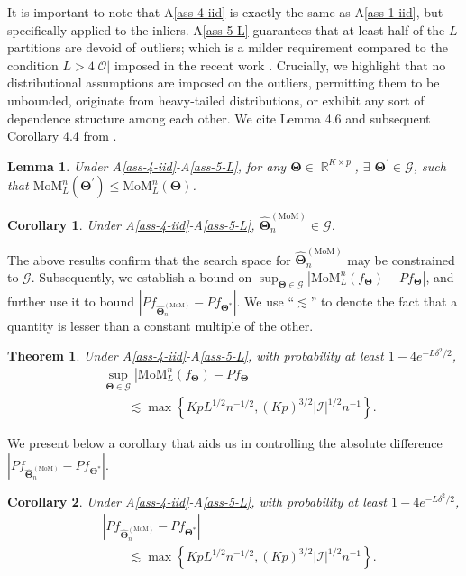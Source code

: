 \documentclass{article}
\def\Real{\mathop{\mathbb{R}}\nolimits}
\newcommand{\bTheta}{\boldsymbol{\Theta}}
\newcommand{\I}{\mathcal{I}}
\newcommand{\cO}{\mathcal{O}}
\newcommand{\tm}{\widehat{\bTheta}_n^{(\text{MoM})}}
\newtheorem{thm}{Theorem}[section]
\newtheorem{lemma}{Lemma}[section]
\newtheorem{cor}{Corollary}[section]
\begin{document}
It is important to note that A\ref{ass-4-iid} is exactly the same as A\ref{ass-1-iid}, but specifically applied to the inliers. A\ref{ass-5-L} guarantees that at least half of the $L$ partitions are devoid of outliers; which is a milder requirement compared to the condition $L > 4|\cO|$ imposed in the recent work \cite{lecue2020robust}. Crucially, we highlight that no distributional assumptions are imposed on the outliers, permitting them to be unbounded, originate from heavy-tailed distributions, or exhibit any sort of dependence structure among each other. We cite Lemma 4.6 and subsequent Corollary 4.4 from \cite{paul2021uniform}.

\begin{lemma}\label{lemma-6-spmom}
Under A\ref{ass-4-iid}-A\ref{ass-5-L}, for any $\bTheta \in \Real^{K\times p}$, $\exists$ $\bTheta^\prime \in \mathscr{G}$, such that $\text{MoM}_L^n(\bTheta^\prime) \le \text{MoM}_L^n(\bTheta)$.
\end{lemma}

\begin{cor}
Under A\ref{ass-4-iid}-A\ref{ass-5-L}, $\tm \in \mathscr{G}$.
\end{cor}

The above results confirm that the search space for $\tm$ may be constrained to $\mathscr{G}$. Subsequently, we establish a bound on $\sup_{\bTheta \in \mathscr{G}} |\text{MoM}^n_L (f_{\bTheta}) - Pf_{\bTheta} |$, and further use it to bound $|P f_{\tm} - P f_{\bTheta^\ast}|$. 
We %
use ``$\lesssim$'' to denote the fact that a quantity is lesser than a constant multiple of the other. %


\begin{thm}\label{thm-4-MoM}
Under A\ref{ass-4-iid}-A\ref{ass-5-L}, with probability at least $1-4e^{-L \delta^2/2}$, 
\begin{align*}
    &\sup_{\bTheta \in \mathscr{G}} \left|\text{MoM}^n_L (f_{\bTheta}) - Pf_{\bTheta} \right|\\ 
    &\qquad\lesssim  \max\left\{ Kp L^{1/2}n^{-1/2}, (Kp)^{3/2}  |\I|^{1/2}n^{-1}\right\}.
\end{align*}
\end{thm}

We present below a corollary that aids us in controlling the absolute difference $|P f_{\tm} - P f_{\bTheta^\ast}|$.

\begin{cor}
Under A\ref{ass-4-iid}-A\ref{ass-5-L}, with  probability at least $1-4e^{-L \delta^2/2}$,
\begin{align*}
    &\left|P f_{\tm} - P f_{\bTheta^\ast}\right|\\ 
    &\qquad\lesssim \max\left\{ KpL^{1/2}n^{-1/2}, (Kp)^{3/2} |\I|^{1/2}n^{-1}\right\}.
\end{align*}
\end{cor}
\end{document}
